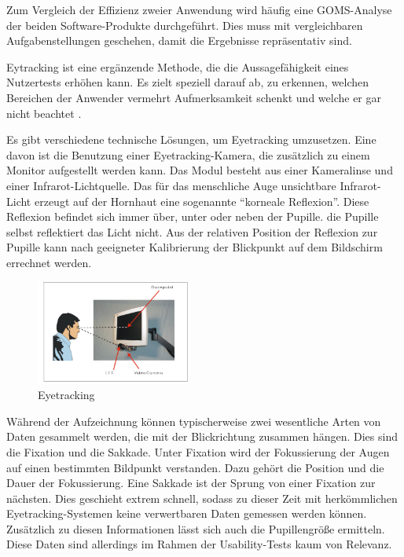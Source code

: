 Zum Vergleich der Effizienz zweier Anwendung wird häufig eine GOMS-Analyse der beiden Software-Produkte durchgeführt. Dies muss mit vergleichbaren Aufgabenstellungen geschehen, damit die Ergebnisse repräsentativ sind.\par
{}
Eytracking ist eine ergänzende Methode, die die Aussagefähigkeit eines Nutzertests erhöhen kann. Es zielt speziell darauf ab, zu erkennen, welchen Bereichen der Anwender vermehrt Aufmerksamkeit schenkt und welche er gar nicht beachtet \cite{Henrici2010}.\par
Es gibt verschiedene technische Lösungen, um Eyetracking umzusetzen. Eine davon ist die Benutzung einer Eyetracking-Kamera, die zusätzlich zu einem Monitor aufgestellt werden kann. Das Modul besteht aus einer Kameralinse und einer Infrarot-Lichtquelle. Das für das menschliche Auge unsichtbare Infrarot-Licht erzeugt auf der Hornhaut eine sogenannte \enquote{korneale Reflexion}. Diese Reflexion befindet sich immer über, unter oder neben der Pupille. die Pupille selbst reflektiert das Licht nicht. Aus der relativen Position der Reflexion zur Pupille kann nach geeigneter Kalibrierung der Blickpunkt auf dem Bildschirm errechnet werden.\par
\begin{figure}[H]
 \centering
 \includegraphics[width=0.45\textwidth]{grafiken/eyegaze.png}
 \caption{Eyetracking \cite{Eyegaze}}
 \label{fig:eyetracking}
\end{figure}
Während der Aufzeichnung können typischerweise zwei wesentliche Arten von Daten gesammelt werden, die mit der Blickrichtung zusammen hängen. Dies sind die Fixation und die Sakkade. Unter Fixation wird der Fokussierung der Augen auf einen bestimmten Bildpunkt verstanden. Dazu gehört die Position und die Dauer der Fokussierung. Eine Sakkade ist der Sprung von einer Fixation zur nächsten. Dies geschieht extrem schnell, sodass zu dieser Zeit mit herkömmlichen Eyetracking-Systemen keine verwertbaren Daten gemessen werden können. Zusätzlich zu diesen Informationen lässt sich auch die Pupillengröße ermitteln. Diese Daten sind allerdings im Rahmen der Usability-Tests kaum von Relevanz.\par
